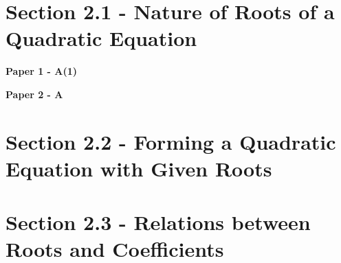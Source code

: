 \documentclass[12pt, a4paper]{article}
\begin{document}
\section*{Section 2.1 - Nature of Roots of a Quadratic Equation }\label{section:4-2-1}

\textbf{Paper 1 - A(1)}
\begin{enumx}[label=\arabic*.,start=1]
\item {}\label{DSE2020-CoreP1-Q07} 
\end{enumx}
\textbf{Paper 2 - A}
\begin{enumx}[label=\arabic*.,start=2]
\item {}\label{DSE2012S-CoreP2-Q07} 
\item {}\label{DSE2012P-CoreP2-Q06} 
\item {}\label{DSE2014-CoreP2-Q04} 
\item {}\label{DSE2015-CoreP2-Q07} 
\item {}\label{DSE2016-CoreP2-Q08} 
\end{enumx}




\section*{Section 2.2 - Forming a Quadratic Equation with Given Roots}\label{section:4-2-2}





\section*{Section 2.3 - Relations between Roots and Coefficients \NF}\label{section:4-2-3}
\end{document}
